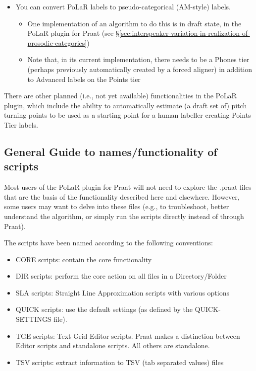 \documentclass[11pt, twoside]{memoir}
\begin{document}
\begin{itemize}
\begin{itemize}
	\end{itemize}
	\item You can convert PoLaR labels to pseudo-categorical (AM-style) labels.
	\begin{itemize}
		\item One implementation of an algorithm to do this is in draft state, in the PoLaR plugin for Praat (see §\ref{sec:interspeaker-variation-in-realization-of-prosodic-categories})
		\item Note that, in its current implementation, there needs to be a Phones tier (perhaps previously automatically created by a forced aligner) in addition to Advanced labels on the Points tier
	\end{itemize}
\end{itemize}

There are other planned (i.e., not yet available) functionalities in the PoLaR plugin, which include the ability to automatically estimate (a draft set of) pitch turning points to be used as a starting point for a human labeller creating Points Tier labels. 

\subsection{General Guide to names/functionality of scripts}
Most users of the PoLaR plugin for Praat will not need to explore the .praat files that are the basis of the functionality described here and elsewhere. However, some users may want to delve into these files (e.g., to troubleshoot, better understand the algorithm, or simply run the scripts directly instead of through Praat).

The scripts have been named according to the following conventions:

\begin{itemize}
	\item CORE scripts: contain the core functionality 
	\item DIR scripts: perform the core action on all files in a Directory\slash Folder
	\item SLA scripts: Straight Line Approximation scripts with various options
	\item QUICK scripts: use the default settings (as defined by the QUICK-SETTINGS file).
	\item TGE scripts: Text Grid Editor scripts. Praat makes a distinction between Editor scripts and standalone scripts. All others are standalone. 
	\item TSV scripts: extract information to TSV (tab separated values) files
\end{itemize}
\end{document}
